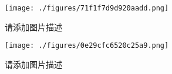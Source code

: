 
\begin{figure}[ht]
\centering
\texttt{[image: ./figures/71f1f7d9d920aadd.png]}
\caption{请添加图片描述} \label{fig_testSR_1}
\end{figure}

\begin{figure}[ht]
\centering
\texttt{[image: ./figures/0e29cfc6520c25a9.png]}
\caption{请添加图片描述} \label{fig_testSR_2}
\end{figure}
